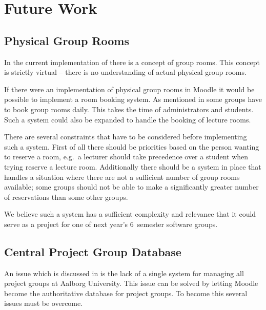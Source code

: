 \chapter{Future Work}
\label{chap:futurework}


\section{Physical Group Rooms}
\label{sec:booking}
In the current implementation of \system{} there is a concept of group rooms.
This concept is strictly virtual -- there is no understanding of actual physical group rooms.

If there were an implementation of physical group rooms in Moodle it would be possible to implement a room booking system.
As mentioned in  some groups have to book group rooms daily.
This takes the time of administrators and students.
Such a system could also be expanded to handle the booking of lecture rooms.

There are several constraints that have to be considered before implementing such a system.
First of all there should be priorities based on the person wanting to reserve a room, e.g.\ a lecturer should take precedence over a student when trying reserve a lecture room.
Additionally there should be a system in place that handles a situation where there are not a sufficient number of group rooms available; some groups should not be able to make a significantly greater number of reservations than some other groups.

We believe such a system has a sufficient complexity and relevance that it could serve as a project for one of next year's $6$\ths~semester software groups.

\section{Central Project Group Database}
An issue which is discussed in  is the lack of a single system for managing all project groups at Aalborg University. 
This issue can be solved by letting Moodle become the authoritative database for project groups. 
To become this several issues must be overcome. 

